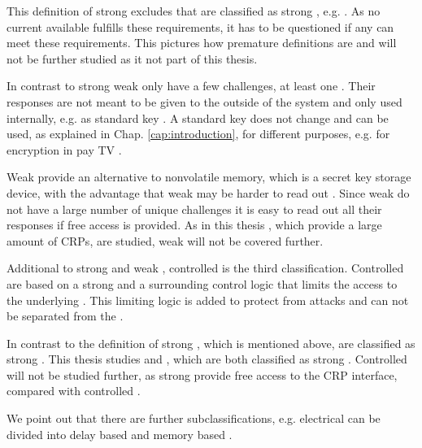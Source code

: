 This definition of strong \pufs excludes \pufs that are classified as strong \puf, e.g. \xpufs \cite{Becker2015ThePUFs}.
As no current available \puf fulfills these requirements, it has to be questioned if any \puf can meet these requirements.
This pictures how premature \puf definitions are and will not be further studied as it not part of this thesis.

In contrast to strong \pufs weak \pufs only have a few challenges, at least one \cite{Ruhrmair2014PUFsGlance}.
Their responses are not meant to be given to the outside of the system and only used internally, e.g. as standard key \cite{Ruhrmair2012AnPUFs}. %
A standard key does not change and can be used, as explained in Chap. \ref{cap:introduction}, for different purposes, e.g. for encryption in pay TV \cite{Wikipedia2016PirateDecryption}. %

Weak \pufs provide an alternative to nonvolatile memory, which is a secret key storage device, with the advantage that weak \pufs may be harder to read out \cite{Lim2005ExtractingCircuits}.
Since weak \pufs do not have a large number of unique challenges it is easy to read out all their responses if free access is provided.
As in this thesis \pufs, which provide a large amount of \acp{CRP}, are studied, weak \pufs will not be covered further.

Additional to strong \puf and weak \puf, controlled \pufs is the third classification.
Controlled \pufs are based on a strong \pufs and a surrounding control logic that limits the access to the underlying \puf.
This limiting logic is added to protect \pufs from attacks and can not be separated from the \puf \cite{Ruhrmair2013PUFData,Gassend2007ControlledFunctions}. %

In contrast to the definition of strong \pufs, which is mentioned above, \apufs are classified as strong \puf \cite{Ruhrmair2010StrongProofs}.
This thesis studies \apufs and \xpufs, which are both classified as strong \puf.  
Controlled \pufs will not be studied further, as strong \pufs provide free access to the \ac{CRP} interface, compared with controlled \pufs. %

We point out that there are further subclassifications, e.g. electrical \pufs can be divided into delay based \pufs and memory based \pufs \cite{Saha2016TV-PUFPUF}.

